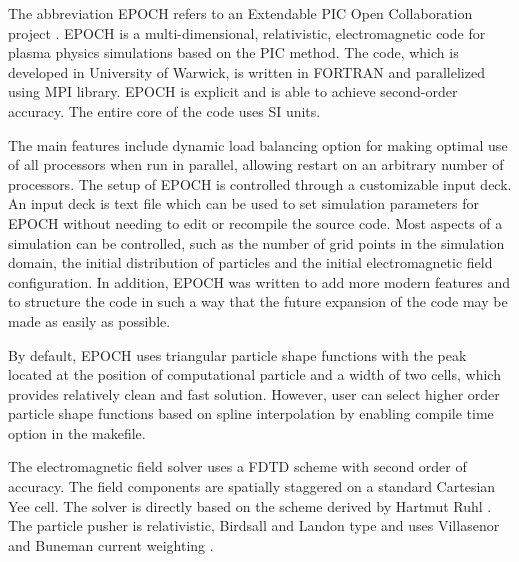 The abbreviation EPOCH refers to an Extendable PIC Open Collaboration project \cite{bennett}. EPOCH is a multi-dimensional, relativistic, electromagnetic code for plasma physics simulations based on the PIC method. The code, which is developed in University of Warwick, is written in FORTRAN and parallelized using MPI library. EPOCH is explicit and is able to achieve second-order accuracy. The entire core of the code uses SI units.

The main features include dynamic load balancing option for making optimal use of all processors when run in parallel, allowing restart on an arbitrary number of processors. The setup of EPOCH is controlled through a customizable input deck. An input deck is text file which can be used to set simulation parameters for EPOCH without needing to edit or recompile the source code. Most aspects of a simulation can be controlled, such as the number of grid points in the simulation domain, the initial distribution of particles and the initial electromagnetic field configuration. In addition, EPOCH was written to add more modern features and to structure the code in such a way that the future expansion of the code may be made as easily as possible.

By default, EPOCH uses triangular particle shape functions with the peak located at the position of computational particle and a width of two cells, which provides relatively clean and fast solution. However, user can select higher order particle shape functions based on spline interpolation by enabling compile time option in the makefile.

The electromagnetic field solver uses a FDTD scheme with second order of accuracy. The field components are spatially staggered on a standard Cartesian Yee cell. The solver is directly based on the scheme derived by Hartmut Ruhl \cite{ruhl}. The particle pusher is relativistic, Birdsall and Landon type \cite{birdsall} and uses Villasenor and Buneman current weighting \cite{villasenor}.  

